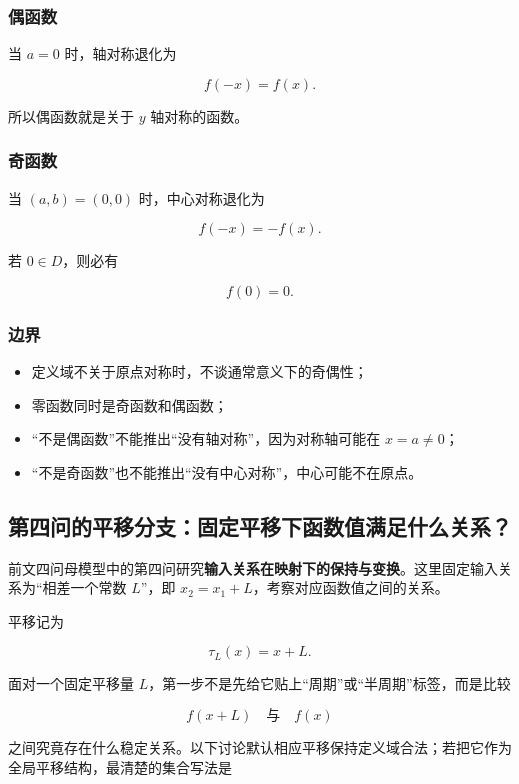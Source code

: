 \documentclass[11pt,a4paper]{ctexart}
\providecommand{\tightlist}{}
\begin{document}
\subsubsection{偶函数}\label{ux5076ux51fdux6570}

当 \(a=0\) 时，轴对称退化为

\[
\boxed{f(-x)=f(x)}.
\]

所以偶函数就是关于 \(y\) 轴对称的函数。

\subsubsection{奇函数}\label{ux5947ux51fdux6570}

当 \((a,b)=(0,0)\) 时，中心对称退化为

\[
\boxed{f(-x)=-f(x)}.
\]

若 \(0\in D\)，则必有

\[
f(0)=0.
\]

\subsubsection{边界}\label{ux8fb9ux754c}

\begin{itemize}
\tightlist
\item
  定义域不关于原点对称时，不谈通常意义下的奇偶性；
\item
  零函数同时是奇函数和偶函数；
\item
  ``不是偶函数''不能推出``没有轴对称''，因为对称轴可能在 \(x=a\ne0\)；
\item
  ``不是奇函数''也不能推出``没有中心对称''，中心可能不在原点。
\end{itemize}

\subsection{第四问的平移分支：固定平移下函数值满足什么关系？}\label{ux5e73ux79fb}

前文四问母模型中的第四问研究\textbf{输入关系在映射下的保持与变换}。这里固定输入关系为“相差一个常数 \(L\)”，即 \(x_2=x_1+L\)，考察对应函数值之间的关系。

平移记为

\[
\tau_L(x)=x+L.
\]

面对一个固定平移量 \(L\)，第一步不是先给它贴上``周期''或``半周期''标签，而是比较

\[
f(x+L)\quad\text{与}\quad f(x)
\]

之间究竟存在什么稳定关系。以下讨论默认相应平移保持定义域合法；若把它作为全局平移结构，最清楚的集合写法是
\end{document}
